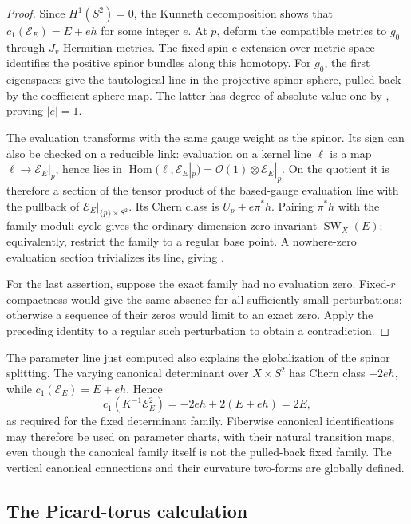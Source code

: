 \begin{proof}
Since \(H^1(S^2)=0\), the Kunneth decomposition shows that
\(c_1(\mathcal E_E)=E+eh\) for some integer \(e\).
At \(p\), deform the compatible metrics to \(g_0\) through
\(J_v\)-Hermitian metrics.  The fixed spin-c extension over metric
space identifies the positive spinor bundles along this homotopy.
For \(g_0\), the first eigenspaces give the tautological line in
the projective spinor sphere, pulled back by the coefficient sphere
map.  The latter has degree of absolute value one by
, proving \(|e|=1\).

The evaluation transforms with the same gauge weight as the
spinor.  Its sign can also be checked on a reducible link: evaluation
on a kernel line \(\ell\) is a map
\(\ell\to\mathcal E_E|_p\), hence lies in
\(\operatorname{Hom}(\ell,\mathcal E_E|_p)
=\mathcal O(1)\otimes\mathcal E_E|_p\).
On the quotient it is therefore a section of the
tensor product of the based-gauge evaluation line with the
pullback of \(\mathcal E_E|_{\{p\}\times S^2}\).
Its Chern class is \(U_p+e\pi^*h\).  Pairing \(\pi^*h\)
with the family moduli cycle gives the ordinary dimension-zero
invariant \(\operatorname{SW}_X(E)\); equivalently, restrict
the family to a regular base point.  A nowhere-zero evaluation
section trivializes its line, giving
.

For the last assertion, suppose the exact family had no evaluation
zero.  Fixed-\(r\) compactness would give the same absence for all
sufficiently small perturbations: otherwise a sequence of their
zeros would limit to an exact zero.  Apply the preceding identity
to a regular such perturbation to obtain a contradiction.
\end{proof}

The parameter line just computed also explains the globalization
of the spinor splitting.  The varying canonical determinant over
\(X\times S^2\) has Chern class \(-2eh\), while
\(c_1(\mathcal E_E)=E+eh\).  Hence
\[
 c_1(K^{-1}\mathcal E_E^2)=-2eh+2(E+eh)=2E,
\]
as required for the fixed determinant family.  Fiberwise canonical
identifications may therefore be used on parameter charts, with
their natural transition maps, even though the canonical family
itself is not the pulled-back fixed family.  The vertical canonical
connections and their curvature two-forms are globally defined.

\subsection{The Picard-torus calculation}


